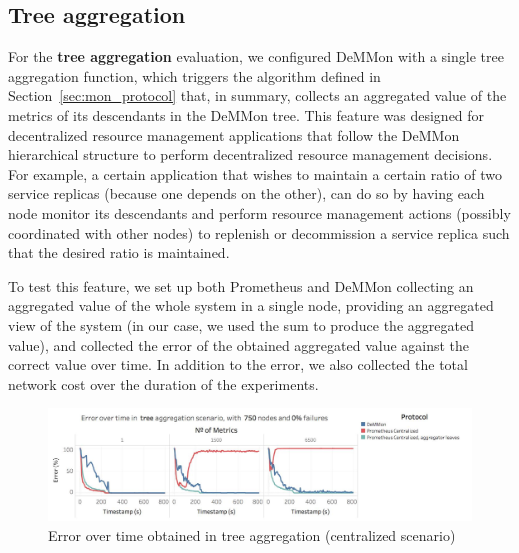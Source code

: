 \subsection{Tree aggregation}

For the \textbf{tree aggregation} evaluation, we configured DeMMon with a single tree aggregation function, which triggers the algorithm defined in Section~\ref{sec:mon_protocol} that, in summary, collects an aggregated value of the metrics of its descendants in the DeMMon tree. This feature was designed for decentralized resource management applications that follow the DeMMon hierarchical structure to perform decentralized resource management decisions. For example, a certain application that wishes to maintain a certain ratio of two service replicas (because one depends on the other), can do so by having each node monitor its descendants and perform resource management actions (possibly coordinated with other nodes) to replenish or decommission a service replica such that the desired ratio is maintained.

To test this feature, we set up both Prometheus and DeMMon collecting an aggregated value of the whole system in a single node, providing an aggregated view of the system (in our case, we used the sum to produce the aggregated value), and collected the error of the obtained aggregated value against the correct value over time. In addition to the error, we also collected the total network cost over the duration of the experiments. 

\begin{figure}
    \centering
    \includegraphics[width=\linewidth]{Chapters/evaluation/figures/aggregation/Error_over_time_tree_0_failures_centralized.jpg}
    \caption{Error over time obtained in tree aggregation (centralized scenario)}
    \label{fig:sec:mon_eval_tree_centralized}
\end{figure}

